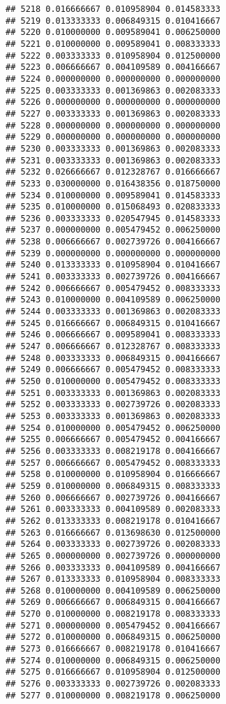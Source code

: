 \documentclass[
]{article}
\begin{document}
\begin{verbatim}
## 5218 0.016666667 0.010958904 0.014583333
## 5219 0.013333333 0.006849315 0.010416667
## 5220 0.010000000 0.009589041 0.006250000
## 5221 0.010000000 0.009589041 0.008333333
## 5222 0.003333333 0.010958904 0.012500000
## 5223 0.006666667 0.004109589 0.004166667
## 5224 0.000000000 0.000000000 0.000000000
## 5225 0.003333333 0.001369863 0.002083333
## 5226 0.000000000 0.000000000 0.000000000
## 5227 0.003333333 0.001369863 0.002083333
## 5228 0.000000000 0.000000000 0.000000000
## 5229 0.000000000 0.000000000 0.000000000
## 5230 0.003333333 0.001369863 0.002083333
## 5231 0.003333333 0.001369863 0.002083333
## 5232 0.026666667 0.012328767 0.016666667
## 5233 0.030000000 0.016438356 0.018750000
## 5234 0.010000000 0.009589041 0.014583333
## 5235 0.010000000 0.015068493 0.020833333
## 5236 0.003333333 0.020547945 0.014583333
## 5237 0.000000000 0.005479452 0.006250000
## 5238 0.006666667 0.002739726 0.004166667
## 5239 0.000000000 0.000000000 0.000000000
## 5240 0.013333333 0.010958904 0.010416667
## 5241 0.003333333 0.002739726 0.004166667
## 5242 0.006666667 0.005479452 0.008333333
## 5243 0.010000000 0.004109589 0.006250000
## 5244 0.003333333 0.001369863 0.002083333
## 5245 0.016666667 0.006849315 0.010416667
## 5246 0.006666667 0.009589041 0.008333333
## 5247 0.006666667 0.012328767 0.008333333
## 5248 0.003333333 0.006849315 0.004166667
## 5249 0.006666667 0.005479452 0.008333333
## 5250 0.010000000 0.005479452 0.008333333
## 5251 0.003333333 0.001369863 0.002083333
## 5252 0.003333333 0.002739726 0.002083333
## 5253 0.003333333 0.001369863 0.002083333
## 5254 0.010000000 0.005479452 0.006250000
## 5255 0.006666667 0.005479452 0.004166667
## 5256 0.003333333 0.008219178 0.004166667
## 5257 0.006666667 0.005479452 0.008333333
## 5258 0.010000000 0.010958904 0.016666667
## 5259 0.010000000 0.006849315 0.008333333
## 5260 0.006666667 0.002739726 0.004166667
## 5261 0.003333333 0.004109589 0.002083333
## 5262 0.013333333 0.008219178 0.010416667
## 5263 0.016666667 0.013698630 0.012500000
## 5264 0.003333333 0.002739726 0.002083333
## 5265 0.000000000 0.002739726 0.000000000
## 5266 0.003333333 0.004109589 0.004166667
## 5267 0.013333333 0.010958904 0.008333333
## 5268 0.010000000 0.004109589 0.006250000
## 5269 0.006666667 0.006849315 0.004166667
## 5270 0.010000000 0.008219178 0.008333333
## 5271 0.000000000 0.005479452 0.004166667
## 5272 0.010000000 0.006849315 0.006250000
## 5273 0.016666667 0.008219178 0.010416667
## 5274 0.010000000 0.006849315 0.006250000
## 5275 0.016666667 0.010958904 0.012500000
## 5276 0.003333333 0.002739726 0.002083333
## 5277 0.010000000 0.008219178 0.006250000

\end{verbatim}
\end{document}
